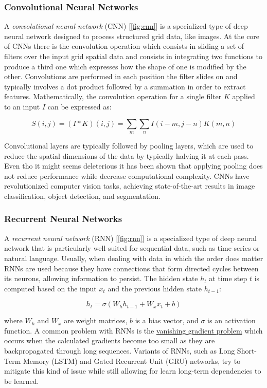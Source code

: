 \documentclass[../Thesis.tex]{subfiles}
\begin{document}
	
	
	\subsubsection{Convolutional Neural Networks}
	A \emph{convolutional neural network} (CNN) [\autoref{fig:cnn}] is a specialized type of deep neural network designed to process structured grid data, like images. At the core of CNNs there is the convolution operation which consists in sliding a set of filters over the input grid spatial data and consists in integrating two functions to produce a third one which expresses how the shape of one is modified by the other. Convolutions are performed in each position the filter slides on and typically involves a dot product followed by a summation in order to extract features. Mathematically, the convolution operation for a single filter \(K\) applied to an input \(I\) can be expressed as:
	
	\[
	S(i, j) = (I * K)(i, j) = \sum_{m} \sum_{n} I(i - m, j - n) K(m, n)
	\]
	
	Convolutional layers are typically followed by pooling layers, which are used to reduce the spatial dimensions of the data by typically halving it at each pass. Even tho it might seems deleterious it has been shown that applying pooling does not reduce performance while decrease computational complexity. CNNs have revolutionized computer vision tasks, achieving state-of-the-art results in image classification, object detection, and segmentation.
	
	
	
	\subsubsection{Recurrent Neural Networks}
	A \emph{recurrent neural network} (RNN) [\autoref{fig:rnn}] is a specialized type of deep neural network that is particularly well-suited for sequential data, such as time series or natural language. Usually, when dealing with data in which the order does matter RNNs are used because they have connections that form directed cycles between its neurons, allowing information to persist. The hidden state \(h_t\) at time step \(t\) is computed based on the input \(x_t\) and the previous hidden state \(h_{t-1}\):
	
	\[
	h_t = \sigma(W_h h_{t-1} + W_x x_t + b)
	\]
	
	where \(W_h\) and \(W_x\) are weight matrices, \(b\) is a bias vector, and \(\sigma\) is an activation function. A common problem with RNNs is the \href{https://en.wikipedia.org/wiki/Vanishing_gradient_problem}{vanishing gradient problem} which occurs when the calculated gradients become too small as they are backpropagated through long sequences. Variants of RNNs, such as Long Short-Term Memory (LSTM) and Gated Recurrent Unit (GRU) networks, try to mitigate this kind of issue while still allowing for learn long-term dependencies to be learned.
	
\end{document}
